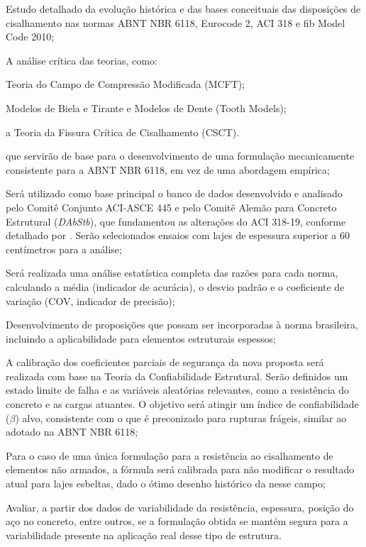 \begin{alineas}
    \item Estudo detalhado da evolução histórica e das bases conceituais das disposições de cisalhamento nas normas ABNT NBR 6118, Eurocode 2, ACI 318 e fib Model Code 2010;
    \item A análise crítica das teorias, como:
	\begin{alineas}
		\item Teoria do Campo de Compressão Modificada (MCFT);
		\item Modelos de Biela e Tirante e Modelos de Dente (Tooth Models);
		\item a Teoria da Fissura Crítica de Cisalhamento (CSCT).
	\end{alineas}\noindent que servirão de base para o desenvolvimento de uma formulação mecanicamente consistente para a ABNT NBR 6118, em vez de uma abordagem empírica;
    \item Será utilizado como base principal o banco de dados desenvolvido e analisado pelo Comitê Conjunto ACI-ASCE 445 e pelo Comitê Alemão para Concreto Estrutural (\textit{DAbStb}), que fundamentou as alterações do ACI 318-19, conforme detalhado por \textcite{Kuchma2019}. Serão selecionados ensaios com lajes de espessura superior a 60 centímetros para a análise;
    \item Será realizada uma análise estatística completa das razões para cada norma, calculando a média (indicador de acurácia), o desvio padrão e o coeficiente de variação (COV, indicador de precisão);
    \item Desenvolvimento de proposições que possam ser incorporadas à norma brasileira, incluindo a aplicabilidade para elementos estruturais espessos;
    \item A calibração dos coeficientes parciais de segurança da nova proposta será realizada com base na Teoria da Confiabilidade Estrutural. Serão definidos um estado limite de falha e as variáveis aleatórias relevantes, como a resistência do concreto e as cargas atuantes. O objetivo será atingir um índice de confiabilidade ($\beta$) alvo, consistente com o que é preconizado para rupturas frágeis, similar ao adotado na ABNT NBR 6118;
    \item Para o caso de uma única formulação para a resistência ao cisalhamento de elementos não armados, a fórmula será calibrada para não modificar o resultado atual para lajes esbeltas, dado o ótimo desenho histórico da \textcite{NBR6118:2023} nesse campo;
    \item Avaliar, a partir dos dados de variabilidade da resistência, espessura, posição do aço no concreto, entre outros, se a formulação obtida se mantém segura para a variabilidade presente na aplicação real desse tipo de estrutura.
\end{alineas}
